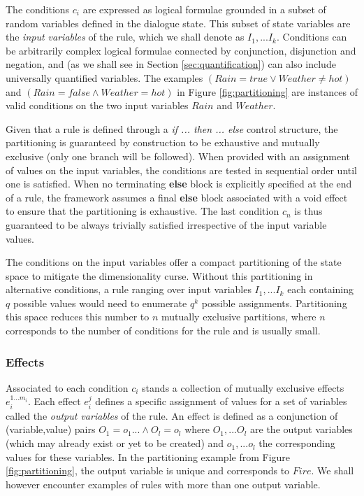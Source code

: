The conditions $c_i$ are expressed as logical formulae grounded in a subset of random variables defined in the dialogue state. This subset of state variables are the \textit{input variables} of the rule, which we shall denote as $I_1,...I_{k}$. Conditions can be arbitrarily complex logical formulae connected by conjunction, disjunction and negation, and (as we shall see in Section \ref{sec:quantification}) can also include universally quantified variables. The examples $(\mathit{Rain}\!=\mathit{true} \lor \mathit{Weather}\!\neq\mathit{hot})$ and $(\mathit{Rain}\!=\mathit{false} \land \mathit{Weather}\!=\mathit{hot})$ in Figure \ref{fig:partitioning} are instances of valid conditions on the two input variables $Rain$ and $\mathit{Weather}$. 

Given that a rule is defined through a \textit{if ... then ... else} control structure, the partitioning is guaranteed by construction to be exhaustive and mutually exclusive (only one branch will be followed).  When provided with an assignment of values on the input variables, the conditions are tested in sequential order until one is satisfied. When no terminating \textbf{else} block is explicitly specified at the end of a rule, the framework assumes a final \textbf{else} block associated with a void effect to ensure that the partitioning is exhaustive. The last condition $c_n$ is thus guaranteed to be always trivially satisfied irrespective of the input variable values. 

The conditions on the input variables offer a compact partitioning of the state space to mitigate the dimensionality curse.  Without this partitioning in alternative conditions, a rule ranging over input variables $I_1,...I_{k}$ each containing $q$ possible values would need to enumerate $q^{k}$ possible assignments.  Partitioning this space reduces this number to $n$ mutually exclusive partitions, where $n$ corresponds to the number of conditions for the rule and is usually small. 


\subsubsection*{Effects}

Associated to each condition $c_i$ stands a collection of mutually exclusive effects $e_i^{1...m_i}$. Each effect $e_i^j$ defines a specific assignment of values for a set of variables called the \textit{output variables} of the rule.  An effect is defined as a conjunction of (variable,value) pairs $O_1\!=\!o_1 ... \land O_{l}\!=\!o_{l}$ where $O_1,... O_{l}$ are the output variables (which may already exist or yet to be created) and $o_1,...o_{l}$ the corresponding values for these variables. In the partitioning example from Figure \ref{fig:partitioning}, the output variable is unique and corresponds to $Fire$. We shall however encounter examples of rules with more than one output variable. 

